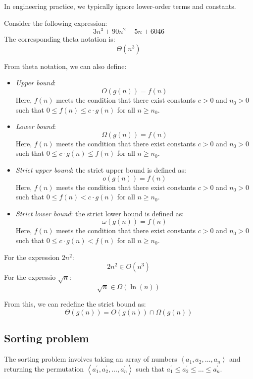In engineering practice, we typically ignore lower-order terms and constants.
\begin{example}
    Consider the following expression: 
    \[3n^3+90n^2-5n+6046\]
    The corresponding theta notation is:
    \[\Theta(n^3)\]
\end{example}

From theta notation, we can also define:
\begin{itemize}
    \item \textit{Upper bound}:
        \[O(g(n))=f(n)\]
        Here, $f(n)$ meets the condition that there exist constants $c > 0$ and $ n_0 > 0$ such that $0 \leq f(n) \leq c \cdot g(n)$ for all $n \geq n_0$. 
    \item \textit{Lower bound}:
        \[\Omega(g(n))=f(n)\]
        Here, $f(n)$ meets the condition that there exist constants $c > 0$ and $ n_0 > 0$ such that $0 \leq c \cdot g(n) \leq f(n)$ for all $n \geq n_0$. 
    \item \textit{Strict upper bound}: the strict upper bound is defined as: 
        \[o(g(n))=f(n)\]
        Here, $f(n)$ meets the condition that there exist constants $c > 0$ and $ n_0 > 0$ such that $0 \leq f(n) < c \cdot g(n)$ for all $n \geq n_0$. 
    \item \textit{Strict lower bound}: the strict lower bound is defined as: 
        \[\omega(g(n))=f(n)\]
        Here, $f(n)$ meets the condition that there exist constants $c > 0$ and $ n_0 > 0$ such that $0 \leq c \cdot g(n) < f(n)$ for all $n \geq n_0$. 
\end{itemize}
\begin{example}
    For the expression $2n^2$: 
    \[2n^2 \in O(n^3)\]
    For the expressio $\sqrt{n}$: 
    \[\sqrt{n} \in \Omega(\ln(n))\]
\end{example}
From this, we can redefine the strict bound as:
\[\Theta(g(n))=O(g(n))\cap\Omega(g(n))\]

\subsection{Sorting problem}
The sorting problem involves taking an array of numbers $\left\langle a_1,a_2,\dots,a_n \right\rangle$ and returning the permutation $\left\langle a_1^\prime,a_2^\prime,\dots,a_n^\prime \right\rangle$ such that $a_1^\prime\leq a_2^\prime \leq \dots \leq a_n^\prime$. 

